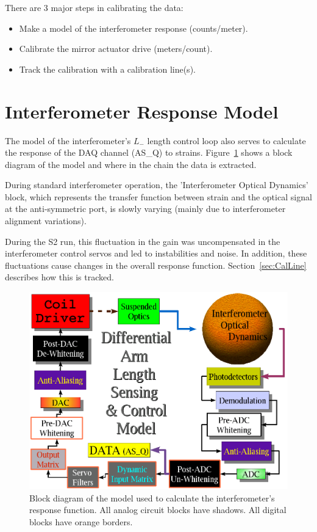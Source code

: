 There are 3 major steps in calibrating the data:

\begin{itemize}

\item Make a model of the interferometer response (counts/meter).

\item Calibrate the mirror actuator drive (meters/count).

\item Track the calibration with a calibration line(s).
 
\end{itemize}

\section{Interferometer Response Model}

The model of the interferometer's $L_-$ length control loop also serves to 
calculate the response of the DAQ channel (AS\_Q) to strains. 
Figure~\ref{fig:DARMmodel} shows a block diagram of the model and where in the
chain the data is extracted.

During standard interferometer operation, the 'Interferometer Optical Dynamics'
block, which represents the transfer function between strain and the optical
signal at the anti-symmetric port, is slowly varying (mainly due to interferometer
alignment variations).

During the S2 run, this fluctuation in the gain was uncompensated in the interferometer
control servos and led to instabilities and noise. In addition, these fluctuations
cause changes in the overall response function. Section~\ref{sec:CalLine} describes
how this is tracked.

\begin{figure}[!h]
\centerline{\includegraphics[angle=0,width=6in]{Figures/Chap5/DARM-model.png}}
\caption[L$_-$ Servo Model]{Block diagram of the model used to calculate the
         interferometer's response function. All analog circuit blocks have shadows.
         All digital blocks have orange borders.}
\label{fig:DARMmodel}
\end{figure}

